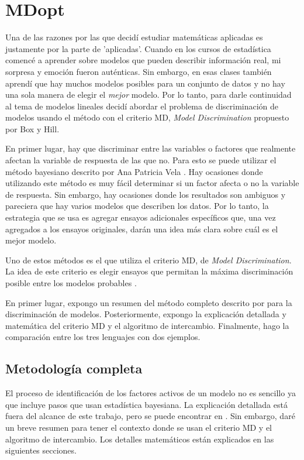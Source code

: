 \chapter{MDopt}

Una de las razones por las que decidí estudiar matemáticas aplicadas es justamente por la parte de 'aplicadas'. Cuando en los cursos de estadística comencé a aprender sobre modelos que pueden describir información real, mi sorpresa y emoción fueron auténticas. Sin embargo, en esas clases también aprendí que hay muchos modelos posibles para un conjunto de datos y no hay una sola manera de elegir el \textit{mejor} modelo. Por lo tanto, para darle continuidad al tema de modelos lineales decidí abordar el problema de discriminación de modelos usando el método con el criterio MD, \textit{Model Discrimination} propuesto por Box y Hill. 

En primer lugar, hay que discriminar entre las variables o factores que realmente afectan la variable de respuesta de las que no. Para esto se puede utilizar el método bayesiano descrito por Ana Patricia Vela \cite{tesis_paty}. Hay ocasiones donde utilizando este método es muy fácil determinar si un factor afecta o no la variable de respuesta. Sin embargo, hay ocasiones donde los resultados son ambiguos y pareciera que hay varios modelos que describen los datos. Por lo tanto, la estrategia que se usa es agregar ensayos adicionales específicos que, una vez agregados a los ensayos originales, darán una idea más clara sobre cuál es el mejor modelo. 

Uno de estos métodos es el  que utiliza el criterio MD, de \textit{Model Discrimination}. La idea de este criterio es elegir ensayos que permitan la máxima discriminación posible entre los modelos probables \cite{meyer1996}. 

En primer lugar, expongo un resumen del método completo descrito por \cite{meyer1996} para la discriminación de modelos. Posteriormente, expongo la explicación detallada y matemática del criterio MD y el algoritmo de intercambio. Finalmente, hago la comparación entre los tres lenguajes con dos ejemplos. 

\section{Metodología completa}

El proceso de identificación de los factores activos de un modelo no es sencillo ya que incluye pasos que usan estadística bayesiana. La explicación detallada está fuera del alcance de este trabajo, pero se puede encontrar en \cite{meyer1996}. Sin embargo, daré un breve resumen para tener el contexto donde se usan el criterio MD y el algoritmo de intercambio. Los detalles matemáticos están explicados en las siguientes secciones. 

